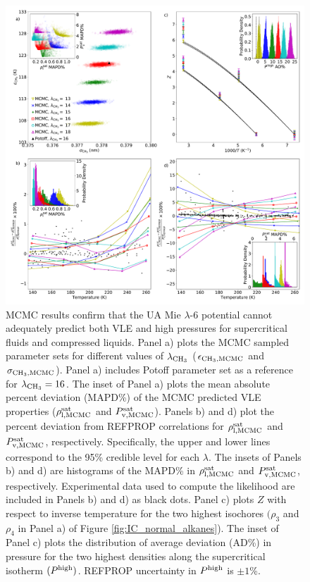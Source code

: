 \documentclass[journal=jctc,manuscript=article]{achemso}
\begin{document}
    

\begin{figure}[htb!]
	\centering
	\includegraphics[width=6.4in]{MCMC_Mie_13_14_15_16_17_18_ethane}
	\caption{MCMC results confirm that the UA Mie $\lambda$-6 potential cannot adequately predict both VLE and high pressures for supercritical fluids and compressed liquids. Panel a) plots the MCMC sampled parameter sets for different values of $\lambda_{\rm CH_3}$ ($\epsilon_{\rm CH_3, MCMC}$ and $\sigma_{\rm CH_3, MCMC}$). Panel a) includes Potoff parameter set as a reference for $\lambda_{\rm CH_3} = 16$. The inset of Panel a) plots the mean absolute percent deviation (MAPD\%) of the MCMC predicted VLE properties ($\rho_{\rm l, MCMC}^{\rm sat}$ and $P_{\rm v, MCMC}^{\rm sat}$). Panels b) and d) plot the percent deviation from REFPROP correlations for $\rho_{\rm l, MCMC}^{\rm sat}$ and $P_{\rm v, MCMC}^{\rm sat}$, respectively. Specifically, the upper and lower lines correspond to the 95\% credible level for each $\lambda$. The insets of Panels b) and d) are histograms of the MAPD\% in $\rho_{\rm l, MCMC}^{\rm sat}$ and $P_{\rm v, MCMC}^{\rm sat}$, respectively. Experimental data used to compute the likelihood are included in Panels b) and d) as black dots. Panel c) plots $Z$ with respect to inverse temperature for the two highest isochores $(\rho_3$ and $\rho_4$ in Panel a) of Figure \ref{fig:IC_normal_alkanes}). The inset of Panel c) plots the distribution of average deviation (AD\%) in pressure for the two highest densities along the supercritical isotherm $(P^{\rm high})$. REFPROP uncertainty in $P^{\rm high}$ is $\pm 1$\%.}
	\label{fig:MCMC_Mie_13_14_15_16_17_18_ethane}
\end{figure} 
\end{document}
